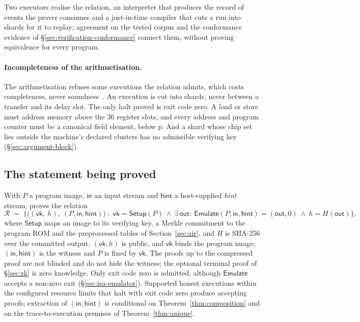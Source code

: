 Two executors realise the relation, an interpreter that produces the record of events the prover consumes and a just-in-time compiler that cuts a run into shards for it to replay; agreement on the tested corpus and the conformance evidence of \S\ref{sec:verification-conformance} connect them, without proving equivalence for every program.

\paragraph{Incompleteness of the arithmetisation.} The arithmetisation refuses some executions the relation admits, which costs completeness, never soundness~\citep[Note~1]{cairo}. An execution is cut into shards, never between a transfer and its delay slot. The only halt proved is exit code zero. A load or store must address memory above the 36 register slots, and every address and program counter must be a canonical field element, below $p$. And a shard whose chip set lies outside the machine's declared clusters has no admissible verifying key (\S\ref{sec:argument-block}).

\subsection{The statement being proved}
\label{sec:statement}

With $P$ a program image, $\mathsf{in}$ an input stream and $\mathsf{hint}$ a host-supplied \emph{hint} stream, \Ziren{} proves the relation
\[
  \mathcal R \;=\; \big\{ \big((\mathsf{vk},\ h),\ (P, \mathsf{in}, \mathsf{hint})\big) \;:\; \mathsf{vk} = \mathsf{Setup}(P) \ \wedge\ \exists\, \mathsf{out} :\ \mathsf{Emulate}(P, \mathsf{in}, \mathsf{hint}) = (\mathsf{out}, 0) \ \wedge\ h = H(\mathsf{out}) \big\},
\]
where $\mathsf{Setup}$ maps an image to its verifying key, a Merkle commitment to the program ROM and the preprocessed tables of Section~\ref{sec:air}, and $H$ is SHA-256 over the committed output. $(\mathsf{vk},h)$ is public, and $\mathsf{vk}$ binds the program image; $(\mathsf{in}, \mathsf{hint})$ is the witness and $P$ is fixed by $\mathsf{vk}$. The proofs up to the compressed proof are not blinded and do not hide the witness; the optional terminal proof of \S\ref{sec:zk} is zero knowledge. Only exit code zero is admitted, although $\mathsf{Emulate}$ accepts a non-zero exit (\S\ref{sec:isa-emulator}). Supported honest executions within the configured resource limits that halt with exit code zero produce accepting proofs; extraction of $(\mathsf{in},\mathsf{hint})$ is conditional on Theorem~\ref{thm:composition} and on the trace-to-execution premises of Theorem~\ref{thm:unique}.
